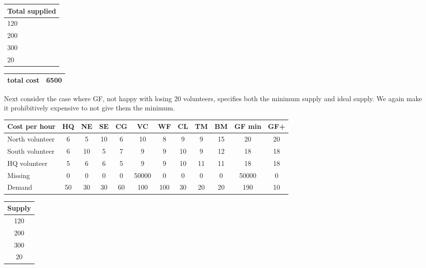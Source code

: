 \begin{center}
\begin{tabular}{|l|}
\hline
Total supplied \\
\hline
120 \\
\hline
200 \\
\hline
300 \\
\hline
20 \\
\hline
\end{tabular}
\end{center}

\begin{center}
\begin{tabular}{|l|l|}
\hline
total cost & 6500 \\
\hline
\end{tabular}
\end{center}

Next consider the case where GF, not happy with losing 20 volunteers, specifies both the minimum supply and ideal supply. We again make it prohibitively expensive to not give them the minimum.

\begin{center}
\begin{tabular}{|l|c|c|c|c|c|c|c|c|c|c|c|}
\hline
Cost per hour & HQ & NE & SE & CG & VC & WF & CL & TM & BM & GF min & GF+ \\
\hline
North volunteer & 6 & 5 & 10 & 6 & 10 & 8 & 9 & 9 & 15 & 20 & 20 \\
\hline
South volunteer & 6 & 10 & 5 & 7 & 9 & 9 & 10 & 9 & 12 & 18 & 18 \\
\hline
HQ volunteer & 5 & 6 & 6 & 5 & 9 & 9 & 10 & 11 & 11 & 18 & 18 \\
\hline
Missing & 0 & 0 & 0 & 0 & 50000 & 0 & 0 & 0 & 0 & 50000 & 0 \\
\hline
Demand & 50 & 30 & 30 & 60 & 100 & 100 & 30 & 20 & 20 & 190 & 10 \\
\hline
\end{tabular}
\end{center}

\begin{center}
\begin{tabular}{|c|}
\hline
\multicolumn{1}{|l|}{Supply} \\
\hline
120 \\
\hline
200 \\
\hline
300 \\
\hline
20 \\
\hline
\end{tabular}
\end{center}

